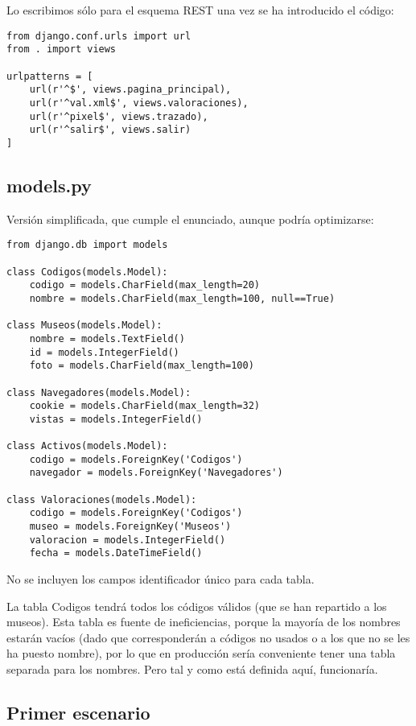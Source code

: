 Lo escribimos sólo para el esquema REST una vez se ha introducido el código:

\begin{verbatim}
from django.conf.urls import url
from . import views

urlpatterns = [
    url(r'^$', views.pagina_principal),
    url(r'^val.xml$', views.valoraciones),
    url(r'^pixel$', views.trazado),
    url(r'^salir$', views.salir)
]
\end{verbatim}

\subsection*{models.py}

Versión simplificada, que cumple el enunciado, aunque podría optimizarse:

\begin{verbatim}
from django.db import models

class Codigos(models.Model):
    codigo = models.CharField(max_length=20)
    nombre = models.CharField(max_length=100, null==True)

class Museos(models.Model):
    nombre = models.TextField()
    id = models.IntegerField()
    foto = models.CharField(max_length=100)

class Navegadores(models.Model):
    cookie = models.CharField(max_length=32)
    vistas = models.IntegerField()

class Activos(models.Model):
    codigo = models.ForeignKey('Codigos')
    navegador = models.ForeignKey('Navegadores')

class Valoraciones(models.Model):
    codigo = models.ForeignKey('Codigos')
    museo = models.ForeignKey('Museos')
    valoracion = models.IntegerField()
    fecha = models.DateTimeField()
\end{verbatim}

No se incluyen los campos identificador único para cada tabla.

La tabla Codigos tendrá todos los códigos válidos (que se han repartido a los museos). Esta tabla es fuente de ineficiencias, porque la mayoría de los nombres estarán vacíos (dado que corresponderán a códigos no usados o a los que no se les ha puesto nombre), por lo que en producción sería conveniente tener una tabla separada para los nombres. Pero tal y como está definida aquí, funcionaría.

\subsection*{Primer escenario}

